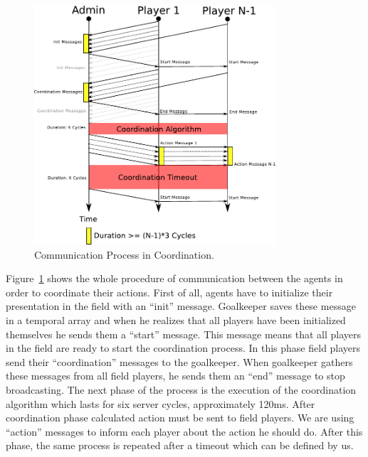 \begin{figure}[t!]
\centering
  \includegraphics[width=0.8\textwidth]{Chapter4/figures/CoordComm.pdf}
  \caption{Communication Process in Coordination.} 
  \label{fig:coordinationprocess}
\end{figure}

Figure~\ref{fig:coordinationprocess} shows the whole procedure of communication between the agents in order to coordinate their actions. First of all, agents have to initialize their presentation in the field with an ``init'' message. Goalkeeper saves these message in a temporal array and when he realizes that all players have been initialized themselves he sends them a ``start'' message. This message means that all players in the field are ready to start the coordination process. In this phase field players send their ``coordination'' messages to the goalkeeper. When goalkeeper gathers these messages from all field players, he sends them an ``end'' message to stop broadcasting. The next phase of the process is the execution of the coordination algorithm which lasts for six server cycles, approximately 120ms. After coordination phase calculated action must be sent to field players. We are using ``action'' messages to inform each player about the action he should do. After this phase, the same process is repeated after a timeout which can be defined by us.


